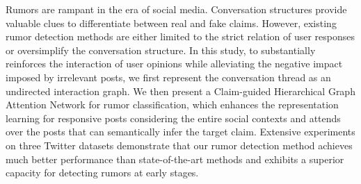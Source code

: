 Rumors are rampant in the era of social media. Conversation structures provide valuable clues to differentiate between real and fake claims. However, existing rumor detection methods are either limited to the strict relation of user responses or oversimplify the conversation structure. In this study, to substantially reinforces the interaction of user opinions while alleviating the negative impact imposed by irrelevant posts, we first represent the conversation thread as an undirected interaction graph. We then present a Claim-guided Hierarchical Graph Attention Network for rumor classification, which enhances the representation learning for responsive posts considering the entire social contexts and attends over the posts that can semantically infer the target claim. Extensive experiments on three Twitter datasets demonstrate that our rumor detection method achieves much better performance than state-of-the-art methods and exhibits a superior capacity for detecting rumors at early stages.
